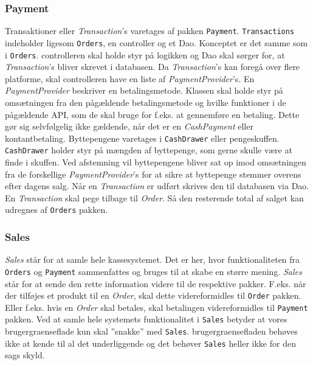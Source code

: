 \subsubsection{Payment}
Transaktioner eller \textit{Transaction}'s varetages af pakken \texttt{Payment}. \texttt{Transactions} indeholder ligesom \texttt{Orders}, en \Gls{controller} og et \Gls{Dao}. Konceptet er det samme som i \texttt{Orders}. \Gls{controller}en skal holde styr på logikken og \Gls{Dao} skal sørger for, at \textit{Transaction}'s bliver skrevet i databasen.
\newline\newline
Da \textit{Transaction}'s kan foregå over flere platforme, skal \gls{controller}en have en liste af \textit{PaymentProvider}'s. En \textit{PaymentProvider}  beskriver en betalingsmetode. Klassen skal holde styr på omsætningen fra den pågældende betalingsmetode og hvilke funktioner i de pågældende \gls{API}, som de skal bruge for f.eks. at gennemføre en betaling. Dette gør sig selvfølgelig ikke gældende, når det er en \textit{CashPayment} eller kontantbetaling. Byttepengene varetages i \texttt{CashDrawer} eller pengeskuffen. \texttt{CashDrawer} holder styr på mængden af byttepenge, som gerne skulle være at finde i skuffen. Ved afstemning vil byttepengene bliver sat op imod omsætningen fra de forskellige \textit{PaymentProvider}'s for at sikre at byttepenge stemmer overens efter dagens salg.
\newline\newline
Når en \textit{Transaction} er udført skrives den til databasen via \gls{Dao}. En \textit{Transaction} skal pege tilbage til \textit{Order}. Så den resterende total af salget kan udregnes af \texttt{Orders} pakken.

\subsubsection{Sales}
\textit{Sales} står for at samle hele kassesystemet. Det er her, hvor funktionaliteten fra \texttt{Orders} og \texttt{Payment} sammenfattes og bruges til at skabe en større mening. \textit{Sales} står for at sende den rette information videre til de respektive pakker. F.eks. når der tilføjes et produkt til en \textit{Order}, skal dette videreformidles til \texttt{Order} pakken. Eller f.eks. hvis en \textit{Order} skal betales, skal betalingen videreformidles til \texttt{Payment} pakken.
\newline\newline
Ved at samle hele systemets funktionalitet i \texttt{Sales} betyder at vores \gls{brugergraenseflade} kun skal ''snakke'' med \texttt{Sales}. \Gls{brugergraenseflade}n behøves ikke at kende til al det underliggende og det behøver \texttt{Sales} heller ikke for den sags skyld.